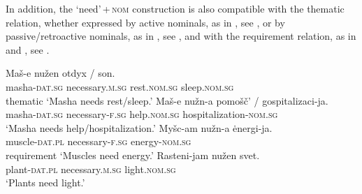 \documentclass[output=paper]{langscibook}
\begin{document}
\ea \label{nuzhen-R}
\z\z

\noindent In addition, the `need'\,+\,\textsc{nom} construction is also compatible with the thematic relation, whether expressed by active nominals, as in , see , or by passive/retroactive nominals, as in , see , and with the requirement relation, as in  and , see .

\ea
\ea \label{nuzhen-active}\gll Maš-e nužen otdyx / son.\\
masha-\textsc{dat.sg} necessary.\textsc{m.sg} rest.\textsc{nom.sg} {} sleep.\textsc{nom.sg}\\ \hfill thematic
\glt `Masha needs rest/sleep.'
\ex \label{nuzhen-passive}\gll Maš-e nužn-a pomošč' / gospitalizaci-ja.\\
masha-\textsc{dat.sg} necessary-\textsc{f.sg} help.\textsc{nom.sg} {}  hospitalization-\textsc{nom.sg}\\
\glt `Masha needs help/hospitalization.'
\z\ex \ea \label{nuzhen-muscles}\gll Myšc-am nužn-a ėnergi-ja. \\
muscle-\textsc{dat.pl} necessary-\textsc{f.sg} energy-\textsc{nom.sg}\\ \hfill requirement
\glt `Muscles need energy.'
\ex \label{nuzhen-plants}\gll Rasteni-jam nužen svet.\\
plant-\textsc{dat.pl} necessary.\textsc{m.sg} light.\textsc{nom.sg}\\
\glt `Plants need light.'
\z\z
\end{document}

